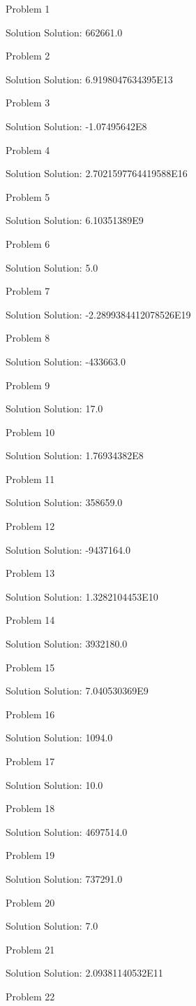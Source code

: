 \documentclass{article}
\begin{document}
Problem 1

Solution Solution: 662661.0

Problem 2

Solution Solution: 6.9198047634395E13

Problem 3

Solution Solution: -1.07495642E8

Problem 4

Solution Solution: 2.7021597764419588E16

Problem 5

Solution Solution: 6.10351389E9

Problem 6

Solution Solution: 5.0

Problem 7

Solution Solution: -2.2899384412078526E19

Problem 8

Solution Solution: -433663.0

Problem 9

Solution Solution: 17.0

Problem 10

Solution Solution: 1.76934382E8

Problem 11

Solution Solution: 358659.0

Problem 12

Solution Solution: -9437164.0

Problem 13

Solution Solution: 1.3282104453E10

Problem 14

Solution Solution: 3932180.0

Problem 15

Solution Solution: 7.040530369E9

Problem 16

Solution Solution: 1094.0

Problem 17

Solution Solution: 10.0

Problem 18

Solution Solution: 4697514.0

Problem 19

Solution Solution: 737291.0

Problem 20

Solution Solution: 7.0

Problem 21

Solution Solution: 2.09381140532E11

Problem 22
\end{document}
